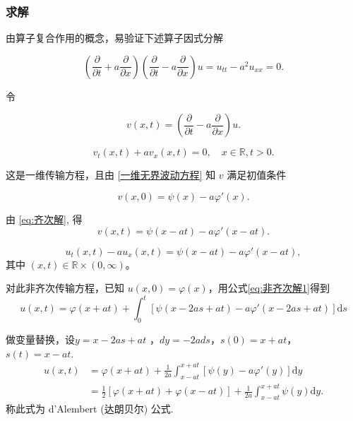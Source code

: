 \documentclass[12pt,a4paper]{article}
\numberwithin{subsection}{section}
\numberwithin{subsubsection}{subsection}
\theoremstyle{plain}
\theoremstyle{definition}
\theoremstyle{remark}
\begin{document}
\subsubsection{求解}
	由算子复合作用的概念，易验证下述算子因式分解
	
	\begin{equation}
		\left( \frac{\partial}{\partial t} + a \frac{\partial}{\partial x} \right) \left( \frac{\partial}{\partial t} - a \frac{\partial}{\partial x} \right) u = u_{tt} - a^2 u_{xx} = 0.
	\end{equation}
	
	令
	
	\begin{equation}
		v(x, t) = \left( \frac{\partial}{\partial t} - a \frac{\partial}{\partial x} \right) u.
	\end{equation}
	
	\begin{equation}
	v_t(x, t) + a v_x(x, t) = 0, \quad x \in \mathbb{R}, t > 0.
\end{equation}
	
	这是一维传输方程，且由 \eqref{一维无界波动方程} 知 \(v\) 满足初值条件
	
	\begin{equation}
	v(x, 0) = \psi(x) - a \varphi'(x).
\end{equation}
	
	由 \eqref{eq:齐次解}, 得
	\begin{equation}
		v(x, t) = \psi(x - a t) - a \varphi'(x - a t).
	\end{equation}
	
	\begin{equation}
		u_t(x, t) - a u_x(x, t) = \psi(x - a t) - a \varphi'(x - a t),
	\end{equation}
	其中 \((x, t) \in \mathbb{R} \times (0, \infty)\)。
	
	对此非齐次传输方程，已知 \(u(x, 0) = \varphi(x)\)，用公式\eqref{eq:非齐次解1}得到
	\begin{equation}
			u(x, t) = \varphi(x + a t) + \int_0^t \left[ \psi(x - 2 a s + a t) - a \varphi'(x - 2 a s + a t) \right] \mathrm{d}s 
	\end{equation}
	
	
做变量替换，设$y=x−2as+at$	，$dy=−2ads$，$s(0)=x+at$，$s(t)=x-at$.
	\begin{equation}\label{eq:达朗贝尔公式}
	\begin{aligned}
		u(x, t) &= \varphi(x + a t) + \frac{1}{2 a} \int_{x - a t}^{x + a t} \left[ \psi(y) - a \varphi'(y) \right] \mathrm{d}y \\
		&= \frac{1}{2} \left[ \varphi(x + a t) + \varphi(x - a t) \right] + \frac{1}{2 a} \int_{x - a t}^{x + a t} \psi(y) \mathrm{d}y.
	\end{aligned}
\end{equation}
称此式为 d'Alembert (达朗贝尔) 公式.
	
\end{document}
